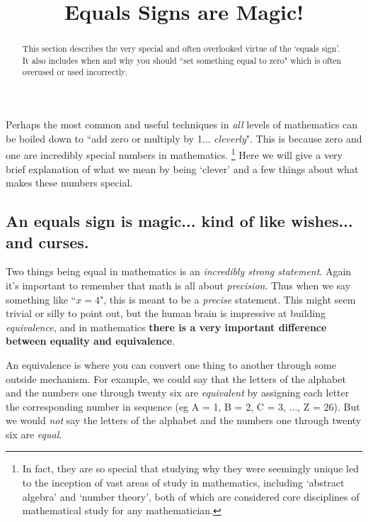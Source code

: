 \documentclass{ximeraXloud}
\title{Equals Signs are Magic!}
\begin{document}
\begin{abstract}
    This section describes the very special and often overlooked virtue of the `equals sign'. It also includes when and why you should ``set something equal to zero" which is often overused or used incorrectly.
\end{abstract}
\maketitle

Perhaps the most common and useful techniques in \textit{all} levels of mathematics can be boiled down to ``add zero or multiply by 1... \textit{cleverly}". This is because zero and one are incredibly special numbers in mathematics.%
\footnote{%
    In fact, they are so special that studying why they were seemingly unique led to the inception of vast areas of study in mathematics, including `abstract algebra' and `number theory', both of which are considered core disciplines of mathematical study for any mathematician.%
    }
Here we will give a very brief explanation of what we mean by being `clever' and a few things about what makes these numbers special.


\subsection*{An equals sign is magic... kind of like wishes... and curses.}

    Two things being equal in mathematics is an \textit{incredibly strong statement}. Again it's important to remember that math is all about \textit{precision}. Thus when we say something like ``$x = 4$", this is meant to be a \textit{precise} statement. This might seem trivial or silly to point out, but the human brain is impressive at building \textit{equivalence}, and in mathematics \textbf{there is a very important difference between equality and equivalence}.
    
    An equivalence is where you can convert one thing to another through some outside mechanism. For example, we could say that the letters of the alphabet and the numbers one through twenty six are \textit{equivalent} by assigning each letter the corresponding number in sequence (eg A = 1, B = 2, C = 3, ..., Z = 26). But we would \textit{not }say the letters of the alphabet and the numbers one through twenty six are \textit{equal}.
    
\end{document}
